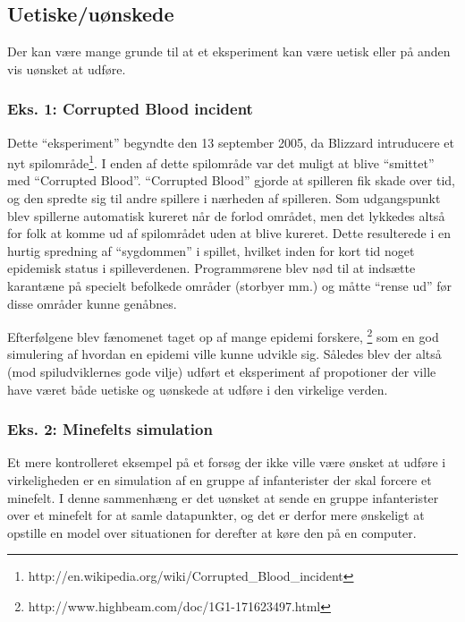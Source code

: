 \subsection{Uetiske/uønskede}
Der kan være mange grunde til at et eksperiment kan være uetisk eller på anden
vis uønsket at udføre.

\subsubsection{Eks. 1: Corrupted Blood incident}
Dette ``eksperiment'' begyndte den 13 september 2005, da Blizzard intruducere et nyt
spilområde\footnote{http://en.wikipedia.org/wiki/Corrupted\_Blood\_incident}.
I enden af dette spilområde var det muligt at blive ``smittet'' med ``Corrupted
Blood''. ``Corrupted Blood'' gjorde at spilleren fik skade over tid, og den
spredte sig til andre spillere i nærheden af spilleren. Som udgangspunkt blev
spillerne automatisk kureret når de forlod området, men det lykkedes altså for folk
at komme ud af spilområdet uden at blive kureret. Dette resulterede i en hurtig spredning
af ``sygdommen'' i spillet, hvilket inden for kort tid noget epidemisk status i spilleverdenen.
Programmørene blev nød til at indsætte karantæne på specielt befolkede områder (storbyer mm.)
og måtte ``rense ud'' før disse områder kunne genåbnes.

Efterfølgene blev fænomenet taget op af mange epidemi forskere,
\footnote{http://www.highbeam.com/doc/1G1-171623497.html} som en god simulering
af hvordan en epidemi ville kunne udvikle sig. Således blev der altså (mod spiludviklernes
gode vilje) udført et eksperiment af propotioner der ville have været både uetiske og
uønskede at udføre i den virkelige verden.

\subsubsection{Eks. 2: Minefelts simulation}
Et mere kontrolleret eksempel på et forsøg der ikke ville være ønsket at udføre i
virkeligheden er en simulation af en gruppe af infanterister der skal forcere et
minefelt. I denne sammenhæng er det uønsket at sende en gruppe infanterister over
et minefelt for at samle datapunkter, og det er derfor mere ønskeligt at opstille
en model over situationen for derefter at køre den på en computer.
